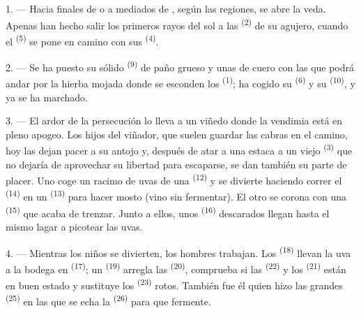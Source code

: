 \VUsaut{6.0mm}
\VUsaut{3.6mm}

\VUsaut{1.4mm}
\VUsaut{4.0mm}

1. --- Hacia finales de  o a mediados de
, según las regiones, se abre la veda. Apenas han
hecho salir los primeros rayos del sol a las 
\textsuperscript{(2)} de su agujero, cuando el  \textsuperscript{(5)} se
pone en camino con sus  \textsuperscript{(4)}.

2. --- Se ha puesto su sólido  \textsuperscript{(9)} de paño
grueso y unas  de cuero con las que podrá andar por la
hierba mojada donde se esconden los  \textsuperscript{(1)}; ha cogido
su  \textsuperscript{(6)} y su  \textsuperscript{(10)}, y ya se
ha marchado.

3. --- El ardor de la persecución lo lleva a un viñedo donde la vendimia
está en pleno apogeo. Los hijos del viñador, que suelen guardar las
cabras en el camino, hoy las dejan pacer a su antojo y, después de atar a
una estaca a un viejo  \textsuperscript{(3)} que no dejaría de
aprovechar su libertad para escaparse, se dan también su parte de placer.
Uno coge un racimo de uvas de una  \textsuperscript{(12)} y
se divierte haciendo correr el  \textsuperscript{(14)} en un 
\textsuperscript{(13)} para hacer mosto (vino sin fermentar). El otro se corona con
una  \textsuperscript{(15)} que acaba de trenzar. Junto a
ellos, unos  \textsuperscript{(16)} descarados llegan hasta el
mismo lagar a picotear las uvas.

4. --- Mientras los niños se divierten, los hombres trabajan. Los
 \textsuperscript{(18)} llevan la uva a la bodega en
 \textsuperscript{(17)}; un  \textsuperscript{(19)} arregla
las  \textsuperscript{(20)}, comprueba si las 
\textsuperscript{(22)} y los  \textsuperscript{(21)} están en buen estado y
sustituye los  \textsuperscript{(23)} rotos. También fue él quien hizo
las grandes  \textsuperscript{(25)} en las que se echa la 
\textsuperscript{(26)} para que fermente.

